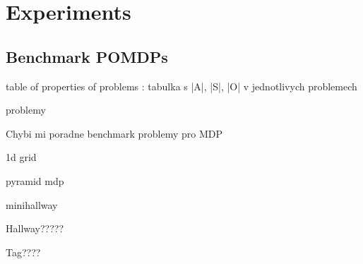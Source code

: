 \part{Experiments}

\chapter{Benchmark POMDPs}

table of properties of problems : tabulka s |A|, |S|, |O| v jednotlivych problemech

problemy

Chybi mi poradne benchmark problemy pro MDP

1d grid

pyramid mdp

minihallway

Hallway?????

Tag????